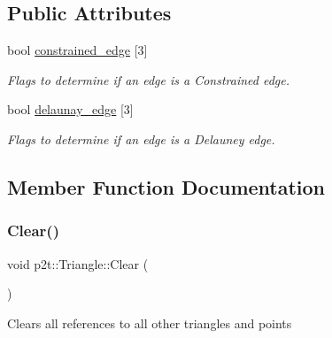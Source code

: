 \subsection*{Public Attributes}
\begin{DoxyCompactItemize}
\item 
\mbox{\label{classp2t_1_1Triangle_ac6ad214e9165836b7db52d67c837f012}} 
bool \hyperlink{classp2t_1_1Triangle_ac6ad214e9165836b7db52d67c837f012}{constrained\+\_\+edge} \mbox{[}3\mbox{]}
\begin{DoxyCompactList}\small\item\em Flags to determine if an edge is a Constrained edge. \end{DoxyCompactList}\item 
\mbox{\label{classp2t_1_1Triangle_a441738dd1e31db27613ea9f73cd3524e}} 
bool \hyperlink{classp2t_1_1Triangle_a441738dd1e31db27613ea9f73cd3524e}{delaunay\+\_\+edge} \mbox{[}3\mbox{]}
\begin{DoxyCompactList}\small\item\em Flags to determine if an edge is a Delauney edge. \end{DoxyCompactList}\end{DoxyCompactItemize}


\subsection{Member Function Documentation}
\mbox{\label{classp2t_1_1Triangle_ad09dfbf0bc0917e4f0b32ffa735f5e6f}} 
\subsubsection{\texorpdfstring{Clear()}{Clear()}\hspace{0.1cm}{\footnotesize\ttfamily [1/2]}}
{\footnotesize\ttfamily void p2t\+::\+Triangle\+::\+Clear (\begin{DoxyParamCaption}{ }\end{DoxyParamCaption})}

Clears all references to all other triangles and points \mbox{\label{classp2t_1_1Triangle_ad09dfbf0bc0917e4f0b32ffa735f5e6f}} 

